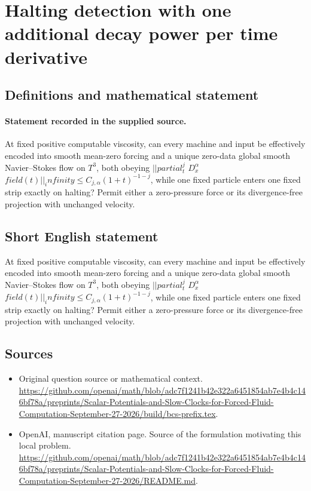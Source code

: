 \documentclass[11pt]{article}
\begin{document}
\section*{Halting detection with one additional decay power per time derivative}\label{statement}
\subsection{Definitions and mathematical statement}
\paragraph{Statement recorded in the supplied source.}
At fixed positive computable viscosity, can every machine and input be effectively encoded into smooth mean-zero forcing and a unique zero-data global smooth Navier–Stokes flow on $T^3$, both obeying $||partial_t^j$ $D_x^\alpha $ $field(t)||_infinity\leq C_{j,\alpha }(1+t)^{-1-j}$, while one fixed particle enters one fixed strip exactly on halting? Permit either a zero-pressure force or its divergence-free projection with unchanged velocity.
\subsection{Short English statement}
At fixed positive computable viscosity, can every machine and input be effectively encoded into smooth mean-zero forcing and a unique zero-data global smooth Navier–Stokes flow on $T^3$, both obeying $||partial_t^j$ $D_x^\alpha $ $field(t)||_infinity\leq C_{j,\alpha }(1+t)^{-1-j}$, while one fixed particle enters one fixed strip exactly on halting? Permit either a zero-pressure force or its divergence-free projection with unchanged velocity.
\subsection{Sources}
\begin{itemize}
\item[S1] Original question source or mathematical context.
\url{https://github.com/openai/math/blob/adc7f1241b42e322a6451854ab7e4b4c146bf78a/preprints/Scalar-Potentials-and-Slow-Clocks-for-Forced-Fluid-Computation-September-27-2026/build/bcs-prefix.tex}.
\item[S2] OpenAI, manuscript citation page. Source of the formulation motivating this local problem.
\url{https://github.com/openai/math/blob/adc7f1241b42e322a6451854ab7e4b4c146bf78a/preprints/Scalar-Potentials-and-Slow-Clocks-for-Forced-Fluid-Computation-September-27-2026/README.md}.
\end{itemize}
\end{document}
